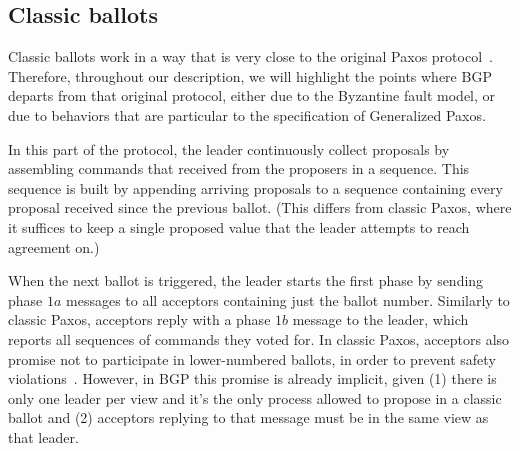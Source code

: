 \subsection{Classic ballots} 

Classic ballots work in a way that is very close to the original Paxos protocol~\cite{Lam98}. Therefore, throughout our description, we will highlight the points where BGP departs from that original protocol, either due to the Byzantine fault model, or due to behaviors that are particular to the specification of Generalized Paxos.\par
In this part of the protocol, the leader continuously collect proposals by assembling commands that received from the proposers in a sequence. This sequence is built by appending arriving proposals to a sequence containing every proposal received since the previous ballot. (This differs from classic Paxos, where it suffices to keep a single proposed value that the leader attempts to reach agreement on.)\par
When the next ballot is triggered, the leader starts the first phase by sending phase $1a$ messages to all acceptors containing just the ballot number. Similarly to classic Paxos, acceptors reply with a phase $1b$ message to the leader, which reports all sequences of commands they voted for. In classic Paxos, acceptors also promise not to participate in lower-numbered ballots, in order to prevent safety violations~\cite{Lam98}.  However, in BGP this promise is already implicit, given (1) there is only one leader per view and it's the only process allowed to propose in a classic ballot and (2) acceptors replying to that message must be in the same view as that leader.\par

